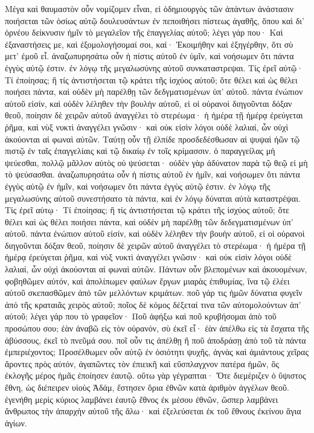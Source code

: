 Μέγα καὶ θαυμαστὸν οὖν νομίζομεν εἶναι, εἰ ὁδημιουργὸς τῶν ἁπάντων ἀνάστασιν ποιήσεται τῶν ὁσίως αὐτῷ δουλευσάντων ἐν πεποιθήσει πίστεως ἀγαθῆς, ὅπου καὶ δι’ ὀρνέου δείκνυσιν ἡμῖν τὸ μεγαλεῖον τῆς ἐπαγγελίας αὐτοῦ; λέγει γάρ που· Καὶ ἐξαναστήσεις με, καὶ ἐξομολογήσομαί σοι, καί· Ἐκοιμήθην καὶ ἐξηγέρθην, ὅτι σὺ μετ’ ἐμοῦ εἶ. ἀναζωπυρησάτω οὖν ἡ πίστις αὐτοῦ ἐν ὑμῖν, καὶ νοήσωμεν ὅτι πάντα ἐγγὺς αὐτῷ ἐστιν. ἐν λόγῳ τῆς μεγαλωσύνης αὐτοῦ συνκαταστρεψαι. Τίς ἐρεῖ αὐτῷ· Τί ἐποίησας; ἢ τίς ἀντιστήσεται τῷ κράτει τῆς ἰσχύος αὐτοῦ; ὅτε θέλει καὶ ὡς θέλει ποιήσει πάντα, καὶ οὐδὲν μὴ παρέλθῃ τῶν δεδγματισμένων ὑπ’ αὐτοῦ. πάντα ἐνώπιον αὐτοῦ εἰσίν, καὶ οὐδὲν λέληθεν τὴν βουλὴν αὐτοῦ, εἰ οἱ οὐρανοὶ διηγοῦνται δόξαν θεοῦ, ποίησιν δὲ χειρῶν αὐτοῦ ἀναγγέλει τὸ στερέωμα· ἡ ἡμέρα τῇ ἡμέρᾳ ἐρεύγεται ῥῆμα, καὶ νὺξ νυκτὶ ἀναγγέλει γνῶσιν· καὶ οὐκ εἰσὶν λόγοι οὐδὲ λαλιαί, ὧν οὐχὶ ἀκούονται αἱ φωναὶ αὐτῶν.
Ταύτῃ οὖν τῇ ἐλπίδε προσδεδέσθωσαν αἱ ψυψαὶ ἡῶν τῷ πιστῷ ἐν ταῖς ἐπαγγελίαις καὶ τῷ δικαίῳ ἐν τοῖς κρίμασσιν. ὁ παραγγείλας μὴ ψεύεσθαι, πολλῷ μᾶλλον αὐτὸς οὐ ψεύσεται· οὐδὲν γὰρ ἀδύνατον παρὰ τῷ θεῷ εἰ μὴ τὸ ψεύσασθαι. ἀναζωπυρησάτω οὖν ἡ πίστις αὐτοῦ ἐν ἡμῖν, καὶ νοήσωμεν ὅτι πάντα ἐγγὺς αὐτῷ ἐν ἡμῖν, καὶ νοήσωμεν ὅτι πάντα ἐγγὺς αὐτῷ ἐστιν. ἐν λόγῳ τῆς μεγαλωσύνης αὐτοῦ συνεστήσατο τὰ πάντα, καὶ ἐν λόγῳ δύναται αὐτὰ καταστρέψαι. Τίς ἐρεῖ αὐτῳ· Τί ἐποίησας; ἢ τίς ἀντιστήσεται τῷ κράτει τῆς ἰσχύος αὐτοῦ; ὅτε θέλει καὶ ὡς θέλει ποιήσει πάντα, καὶ οὐδὲν μὴ παρέλθῃ τῶν δεδεγματισμένων ὑπ’ αὐτοῦ. πάντα ἐνώπιον αὐτοῦ εἰσίν, καὶ οὐδὲν λέληθεν τὴν βουὴν αὐτοῦ, εἰ οἱ οὐρανοὶ διηγοῦνται δόξαν θεοῦ, ποίησιν δὲ χειρῶν αὐτοῦ ἀναγγέλει τὸ στερέωμα· ἡ ἡμέρα τῇ ἡμέρᾳ ἐρεύγεται ῥῆμα, καὶ νὺξ νυκτὶ ἀναγγέλει γνῶσιν· καὶ οὐκ εἰσὶν λόγοι οὐδὲ λαλιαί, ὧν οὐχὶ ἀκούονται αἱ φωναὶ αὐτῶν.
Πάντων οὖν βλεπομένων καὶ ἀκουομένων, φοβηθῶμεν αὐτόν, καὶ ἀπολίπωμεν φαύλων ἔργων μιαρὰς ἐπιθυμίας, ἵνα τῷ ἐλέει αὐτοῦ σκεπασθῶμεν ἀπό τῶν μελλόντων κριμάτων. ποῦ γάρ τις ἡμῶν δύνατια φυγεῖν ἀπό τῆς κραταιᾶς χειρὸς αὐτοῦ; ποῖος δὲ κόμος δέξεταί τινα τῶν αὐτομολούντων ἀπ’ αὐτοῦ; λέγει γάρ που τὸ γραφεῖον· Ποῦ ἀφήξω καὶ ποῦ κρυβήσομαι ἀπὸ τοῦ προσώπου σου; ἐὰν ἀναβῶ εἰς τὸν οὐρανόν, σὺ ἐκεῖ εἶ· ἐὰν ἀπέλθω εἰς τὰ ἔσχατα τῆς ἀβύσσους, ἐκεῖ τὸ πνεῦμά σου. ποῖ οὖν τις ἀπέλθῃ ἢ ποῦ ἀποδράσῃ ἀπὸ τοῦ τὰ πάντα ἐμπεριέχοντος;
Προσέλθωμεν οὖν αὐτῷ ἐν ὁσιότητι ψυχῆς, ἁγνὰς καὶ ἀμιάντους χεῖρας ἄροντες πρὸς αὐτόν, ἀγαπῶντες τὸν ἐπιεικῆ καὶ εὔσπλαγχνον πατέρα ἡμῶν, ὃς ἐκλογῆς μέρος ἡμᾶς ἐποίησεν ἐαυτῷ. οὕτω γὰρ γέγραπται· Ὅτε διεμέριζεν ὁ ὕψιστος ἔθνη, ὡς διέπειρεν υἱοὺς Ἀδάμ, ἔστησεν ὅρια ἐθνῶν κατὰ ἀριθμὸν ἀγγέλων θεοῦ. ἐγενήθη μερὶς κύριος λαμβάνει ἑαυτῷ ἔθνος ἐκ μέσου ἐθνῶν, ὥσπερ λαμβάνει ἄνθρωπος τὴν ἀπαρχὴν αὐτοῦ τῆς ἅλω· καὶ ἐξελεύσεται ἐκ τοῦ ἔθνους ἐκείνου ἅγια ἁγίων. 
